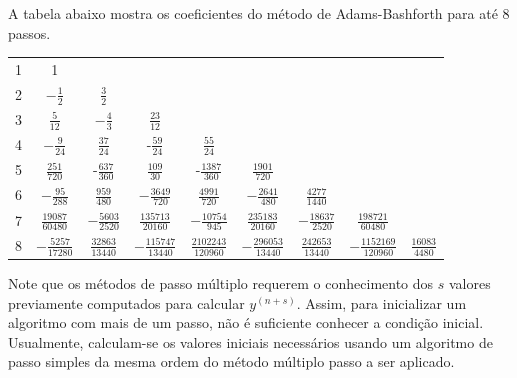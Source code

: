 A tabela abaixo mostra os coeficientes do método de Adams-Bashforth para até 8 passos.
 \begin{center}
\begin{tabular}{|c|cccccccc|}
\hline
1 & 1 &&&&&&&\\
2 & $-\frac{1}{2}$ & $\frac{3}{2}$&&&&&&\\
3 & $\frac{5}{12}$ & $-\frac{4}{3}$ & $\frac{23}{12}$&&&&&\\
4 & $-\frac{9}{24}$ & $\frac{37}{24}$ & -$\frac{59}{24}$ & $\frac{55}{24}$&&&&\\
5 & $\frac{251}{720}$ & -$\frac{637}{360}$ & $\frac{109}{30}$& -$\frac{1387}{360}$& $\frac{1901}{720}$&&&\\
6 & $-{\frac {95}{288}}$ & ${\frac {959}{480}}$ & $-{\frac {3649}{720}}$ & ${\frac {4991}{720}}$ & $-{\frac {2641}{480}}$ & $\frac {4277}{1440}$&&\\
7 & $\frac {19087}{60480}$ & $-{\frac {5603}{2520}}$ & ${\frac {135713}{20160}}$ & $-{\frac {10754}{945}}$ & ${\frac {235183}{20160}}$ & $-{\frac {18637}{2520}}$ & ${\frac {198721}{60480}}$&\\
8 & $-{\frac {5257}{17280}}$&${\frac {32863}{13440}}$&$-{\frac {115747}{13440}}$&${\frac {2102243}{120960}}$&$-{\frac {296053}{13440}}$&${\frac {242653}{13440}}$&$-{\frac {1152169}{120960}}$&${\frac {16083}{4480}}$\\
\hline
\end{tabular}
 \end{center}
\begin{obs} Note que os métodos de passo múltiplo requerem o conhecimento dos $s$ valores previamente computados para calcular $y^{(n+s)}$. Assim, para inicializar um algoritmo com mais de um passo, não é suficiente conhecer a condição inicial. Usualmente, calculam-se os valores iniciais necessários usando um algoritmo de passo simples da mesma ordem do método múltiplo passo a ser aplicado.
\end{obs}




